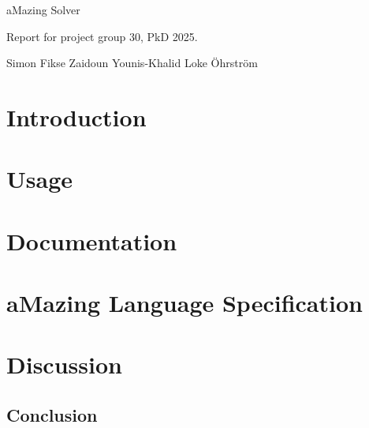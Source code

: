 \documentclass[12pt, a4paper]{article}
\begin{document}
\begin{titlepage}
    \vspace*{\fill}
    \begin{center}

        \begin{LARGE}
            aMazing Solver
        \end{LARGE}

        \vspace{5mm}

        \begin{large}
            Report for project group 30, PkD 2025.
        \end{large}

        \vspace{5mm}

        Simon Fikse \quad Zaidoun Younis-Khalid \quad Loke Öhrström

    \end{center}
    \vspace*{\fill}
\end{titlepage}

\newpage
\tableofcontents
\newpage

\section{Introduction}



\section{Usage}



\newpage

\section{Documentation}



\newpage

\section{aMazing Language Specification}



\newpage

\section{Discussion}

\subsection{Conclusion}
\end{document}
